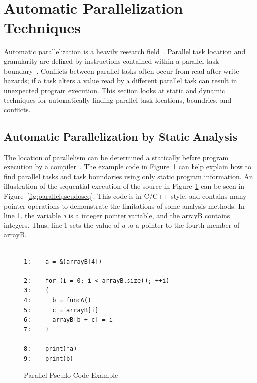 \documentclass[defaultstyle,11pt]{thesis}
\begin{document}
\section{Automatic Parallelization Techniques}

Automatic parallelization is a heavily research
field~\cite{hoeflinger:98:uiuccs, blume:1992:pds, Hall:2005wd}.
Parallel task location and granularity are defined by instructions
contained within a parallel task boundary~\cite{chen:1990:isca}.
Conflicts between parallel tasks often occur from read-after-write
hazards; if a task alters a value read by a different parallel task
can result in unexpected program execution.  This section looks at
static and dynamic techniques for automatically finding parallel task
locations, boundries, and conflicts.

\subsection{Automatic Parallelization by Static Analysis}

The location of parallelism can be determined a statically before
program execution by a
compiler~\cite{bringmann:95:uiuccs,dou:2007:trans}.  The example code
in Figure~\ref{fig:parallelpseudosrc} can help explain how to find
parallel tasks and task boundaries using only static program
information.  An illustration of the sequential execution of the
source in Figure~\ref{fig:parallelpseudosrc} can be seen in
Figure~\ref{fig:parallelpseudoseq}.  This code is in C/C++ style, and
contains many pointer operations to demonstrate the limitations of some
analysis methods.  In line 1, the variable \textit{a} is a integer
pointer variable, and the arrayB contains integers.  Thus, line 1 sets
the value of \textit{a} to a pointer to the fourth member of arrayB.

\begin{figure}
  \begin{lstlisting}
    
1:    a = &(arrayB[4])

2:    for (i = 0; i < arrayB.size(); ++i)
3:    {
4:      b = funcA()
5:      c = arrayB[i]
6:      arrayB[b + c] = i
7:    }
    
8:    print(*a)
9:    print(b)

  \end{lstlisting}
  \caption{Parallel Pseudo Code Example}
  \label{fig:parallelpseudosrc}
\end{figure}
\end{document}

